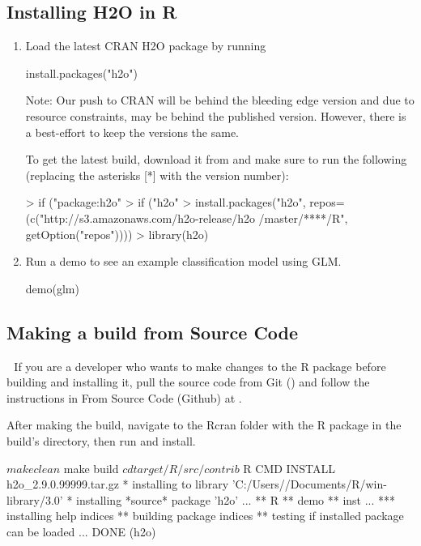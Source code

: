 \documentclass[11pt]{article}
\begin{document}
\subsection{Installing H2O in R}
\begin{enumerate}
\item Load the latest CRAN H2O package by running \begin{spverbatim} install.packages("h2o") \end{spverbatim} 

Note: Our push to CRAN will be behind the bleeding edge version and due to resource constraints, may be behind the published version. However, there is a best-effort to keep the versions the same. 

To get the latest build, download it from  and make sure to run the following (replacing the asterisks [*] with the version number): 
\begin{spverbatim}
> if ("package:h2o" %
> if ("h2o" %
> install.packages("h2o", repos=(c("http://s3.amazonaws.com/h2o-release/h2o
/master/****/R", getOption("repos"))))
> library(h2o)
\end{spverbatim}
\item Run a demo to see an example classification model using GLM. 
\begin{spverbatim}
demo(glm)
\end{spverbatim}
\end{enumerate}

\subsection{Making a build from Source Code} 
If you are a developer who wants to make changes to the R package before building and installing it, pull the source code from Git () and follow the instructions in From Source Code (Github) at .

After making the build, navigate to the Rcran folder with the R package in the build’s directory, then run and install.
\begin{spverbatim}
$ make clean
$ make build
$ cd target/R/src/contrib
$ R CMD INSTALL h2o_2.9.0.99999.tar.gz
* installing to library 'C:/Users//Documents/R/win-library/3.0'
* installing *source* package 'h2o' ...
** R
** demo
** inst
...
*** installing help indices
** building package indices
** testing if installed package can be loaded
...
DONE (h2o)
\end{spverbatim}
\end{document}
